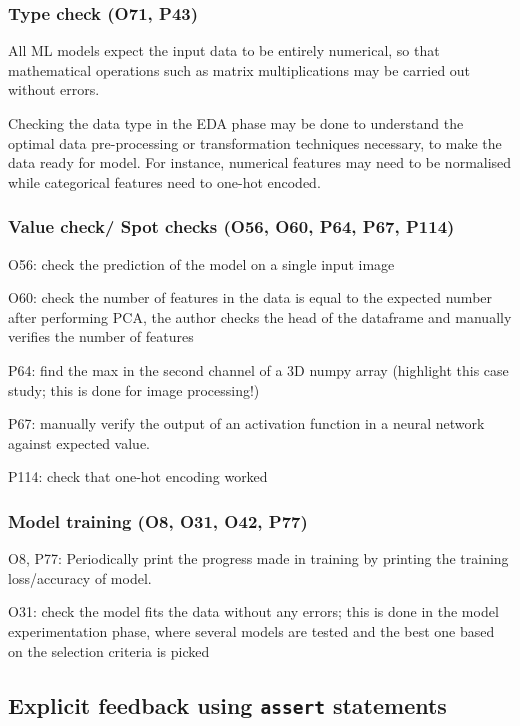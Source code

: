 \subsubsection{Type check (O71, P43)}

All ML models expect the input data to be entirely numerical, so that mathematical operations such as matrix multiplications may be carried out without errors.

Checking the data type in the EDA phase may be done to understand the optimal data pre-processing or transformation techniques necessary, to make the data ready for model. For instance, numerical features may need to be normalised while categorical features need to one-hot encoded.

\subsubsection{Value check/ Spot checks (O56, O60, P64, P67, P114)}

O56: check the prediction of the model on a single input image

O60: check the number of features in the data is equal to the expected number after performing PCA, the author checks the head of the dataframe and manually verifies the number of features

P64: find the max in the second channel of a 3D numpy array (highlight this case study; this is done for image processing!)

P67: manually verify the output of an activation function in a neural network against expected value.

P114: check that one-hot encoding worked

\subsubsection{Model training (O8, O31, O42, P77)}

O8, P77: Periodically print the progress made in training by printing the training loss/accuracy of model.

O31: check the model fits the data without any errors; this is done in the model experimentation phase, where several models are tested and the best one based on the selection criteria is picked

\subsection{Explicit feedback using \texttt{assert} statements}

